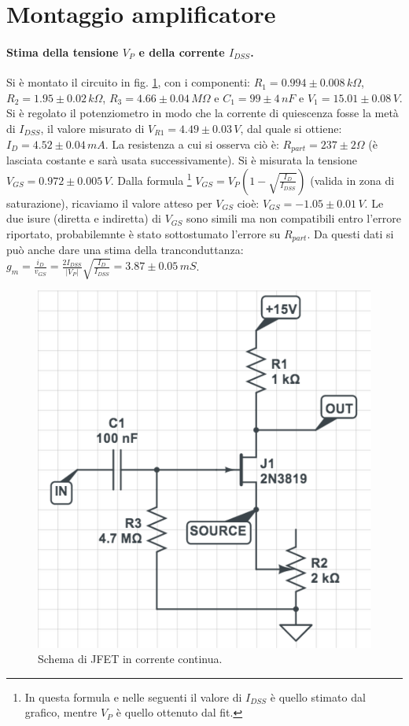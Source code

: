 \documentclass[10pt,a4paper]{article}
\begin{document}
\section{Montaggio amplificatore}

\paragraph{Stima della tensione $V_P$ e della corrente $I_{DSS}$.}
Si è montato il circuito in fig. \ref{circuito2}, con i componenti: $R_1 = 0.994\pm0.008 \, k\Omega $, $R_2 = 1.95\pm0.02 \, k \Omega $, $R_3 = 4.66 \pm 0.04 \, M \Omega$ e $C_1 = 99\pm4 \, nF$ e $V_1 = 15.01\pm0.08 \, V$. Si è regolato il potenziometro in modo che la corrente di quiescenza fosse la metà di $I_{DSS}$, il valore misurato di $V_{R1} = 4.49 \pm 0.03 \, V$, dal quale si ottiene: $I_D = 4.52\pm0.04\,mA$. La resistenza a cui si osserva ciò è: $R_{part} = 237\pm2 \Omega$ (è lasciata costante e sarà usata successivamente). Si è misurata la tensione $V_{GS} = 0.972 \pm 0.005 \,V$. Dalla formula \footnote{In questa formula e nelle seguenti il valore di $I_{DSS}$ è quello stimato dal grafico, mentre $V_P$ è quello ottenuto dal fit.} $V_{GS} = V_{P} \left( 1 - \sqrt{\frac{I_D}{I_{DSS}}} \right)$ (valida in zona di saturazione), ricaviamo il valore atteso per $V_{GS}$ cioè: $V_{GS} = -1.05\pm0.01 \, V$. Le due isure (diretta e indiretta) di $V_{GS}$ sono simili ma non compatibili entro l'errore riportato, probabilemnte è stato sottostumato l'errore su $R_{part}$. 
Da questi dati si può anche dare una stima della tranconduttanza: $g_m = \frac{i_D}{v_{GS}} = \frac{2I_{DSS}}{\vert V_P \vert} \sqrt{\frac{I_D}{I_{DSS}}} = 3.87\pm0.05\,mS$. 

\begin{figure}
\centering
\includegraphics[scale=0.3]{circuito2.png}
\caption{Schema di JFET in corrente continua.\label{circuito2}}
\end{figure}
\end{document}
